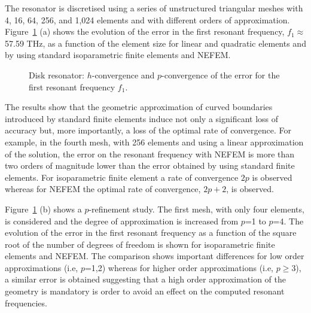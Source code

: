 The resonator is discretised using a series of unstructured triangular meshes with 4, 16, 64, 256, and 1,024 elements and with different orders of approximation. Figure~\ref{fig:circleFEMvsNEFEM_Convergence} (a) shows the evolution of the error in the first resonant frequency, $f_1 \approx$ 57.59 THz, as a function of the element size for linear and quadratic elements and by using standard isoparametric finite elements and NEFEM. 
\begin{figure}[!ht]
	\centering
	\caption{Disk resonator: $h$-convergence and $p$-convergence of the error for the first resonant frequency $f_1$.}
	\label{fig:circleFEMvsNEFEM_Convergence}
\end{figure}
The results show that the geometric approximation of curved boundaries introduced by standard finite elements induce not only a significant loss of accuracy but, more importantly, a loss of the optimal rate of convergence. For example, in the fourth mesh, with 256 elements and using a linear approximation of the solution, the error on the resonant frequency with NEFEM is more than two orders of magnitude lower than the error obtained by using standard finite elements. For isoparametric finite element a rate of convergence $2p$ is observed whereas for NEFEM the optimal rate of convergence, $2p+2$, is observed. 

Figure~\ref{fig:circleFEMvsNEFEM_Convergence} (b) shows a $p$-refinement study. The first mesh, with only four elements, is considered and the degree of approximation is increased from $p$=1 to $p$=4. The evolution of the error in the first resonant frequency as a function of the square root of the number of degrees of freedom is shown for isoparametric finite elements and NEFEM. The comparison shows important differences for low order approximations (i.e, $p$=1,2) whereas for higher order approximations (i.e, $p \geq$3), a similar error is obtained suggesting that a high order approximation of the geometry is mandatory is order to avoid an effect on the computed resonant frequencies. 

